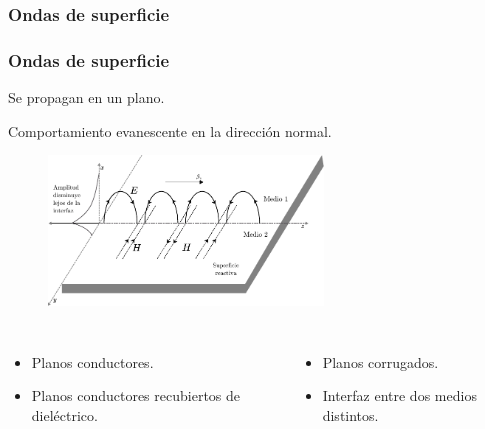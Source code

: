 \documentclass{beamer}
\begin{document}
		\subsubsection{Ondas de superficie}
		
			\begin{frame}
			\frametitle{Ondas de superficie}
			
			\begin{block}{}
				\centering
				Se propagan en un plano.
				
				Comportamiento evanescente en la dirección normal.
			\end{block}
			
			\begin{figure}[]
				\includegraphics[width=0.65\textwidth]{intro_electro/ondas-superficie-3d.pdf}
			\end{figure}
		
			\begin{columns}[c] %
				\begin{itemize}
					\item Planos conductores.
					\item Planos conductores recubiertos de dieléctrico.
				\end{itemize}

				\begin{itemize}
					\item Planos corrugados.
					\item Interfaz entre dos medios distintos.
				\end{itemize}
			\end{columns}
			
			\end{frame}
	
\end{document}
